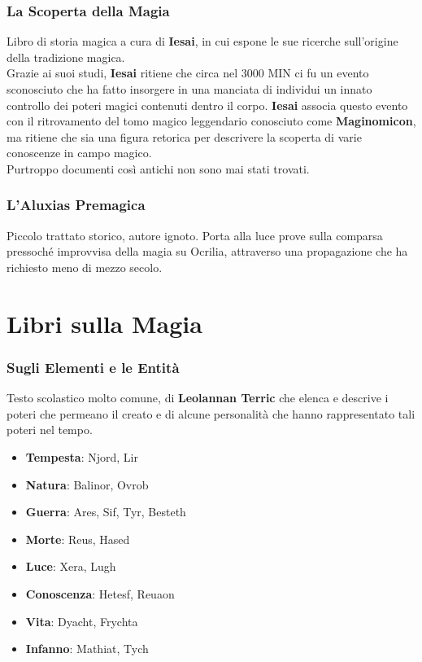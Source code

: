 \documentclass[10pt,twoside,onecolumn,openany]{book}
\begin{document}
\subsubsection{La Scoperta della Magia}
Libro di storia magica a cura di \textbf{Iesai}, in cui espone le sue ricerche sull'origine della tradizione magica.\\
Grazie ai suoi studi, \textbf{Iesai} ritiene che circa nel 3000 MIN ci fu un evento sconosciuto che ha fatto insorgere in una manciata di individui un innato controllo dei poteri magici contenuti dentro il corpo. \textbf{Iesai} associa questo evento con il ritrovamento del tomo magico leggendario conosciuto come \textbf{Maginomicon}, ma ritiene che sia una figura retorica per descrivere la scoperta di varie conoscenze in campo magico.\\
Purtroppo documenti così antichi non sono mai stati trovati.
\subsubsection{L'Aluxias Premagica} Piccolo trattato storico, autore ignoto. Porta alla luce prove sulla comparsa pressoché improvvisa della magia su Ocrilia, attraverso una propagazione che ha richiesto meno di mezzo secolo.
\section{Libri sulla Magia}
\subsubsection{Sugli Elementi e le Entità} Testo scolastico molto comune, di \textbf{Leolannan Terric} che elenca e descrive i poteri che permeano il creato e di alcune personalità che hanno rappresentato tali poteri nel tempo.
\begin{multicols}{2}
\begin{itemize}
\item \textbf{Tempesta}: Njord, Lir
\item \textbf{Natura}: Balinor, Ovrob
\item \textbf{Guerra}: Ares, Sif, Tyr, Besteth
\item \textbf{Morte}: Reus, Hased
\item \textbf{Luce}: Xera, Lugh
\item \textbf{Conoscenza}: Hetesf, Reuaon
\item \textbf{Vita}: Dyacht, Frychta
\item \textbf{Infanno}: Mathiat, Tych
\end{itemize}
\end{multicols}
\end{document}
